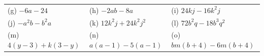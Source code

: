 \begin{enumerate}[noitemsep, label=\textbf{\arabic*}. ]
{\begin{tabular}[t]{|l|l|l|}
     \tabularnewline\cline{1-1}\cline{2-2}\cline{3-3}
        (g) $-6a-24$ &
        (h) $-2ab-8a$ &
        (i) $24kj-16{k}^{2}j$%
     \tabularnewline\cline{1-1}\cline{2-2}\cline{3-3}
        (j) $-{a}^{2}b-{b}^{2}a$ &
        (k) $12{k}^{2}j+24{k}^{2}{j}^{2}$ &
        (l) $72{b}^{2}q-18{b}^{3}{q}^{2}$%
     \tabularnewline\cline{1-1}\cline{2-2}\cline{3-3}
        (m) $4\left(y-3\right)+k\left(3-y\right)$ &
        (n) $a\left(a-1\right)-5\left(a-1\right)$ &
        (o) $bm\left(b+4\right)-6m\left(b+4\right)$%
     \tabularnewline\cline{1-1}\cline{2-2}\cline{3-3}

\end{tabular}}
\end{enumerate}
